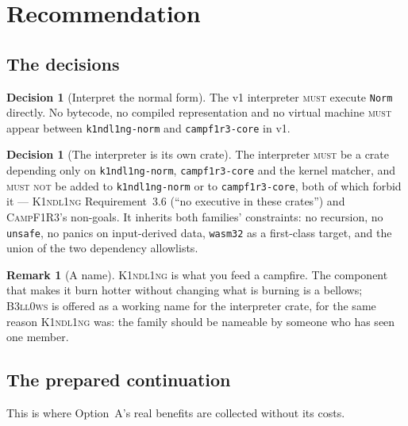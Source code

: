 \documentclass[11pt,a4paper]{article}
\newcommand{\code}[1]{\texttt{#1}}
\newcommand{\Kind}{\textsc{K1ndl1ng}}
\newcommand{\Camp}{\textsc{CampF1R3}}
\newcommand{\Bell}{\textsc{B3ll0ws}}
\newcommand{\MUST}{\textsc{must}}
\newcommand{\MUSTNOT}{\textsc{must not}}
\newcommand{\Norm}{\code{Norm}}
\theoremstyle{definition}
\newtheorem{decision}[definition]{Decision}
\newtheorem{remark}[definition]{Remark}
\theoremstyle{plain}
\begin{document}
\section{Recommendation}\label{sec:rec}

\subsection{The decisions}

\begin{decision}[Interpret the normal form]\label{dec:main}
The v1 interpreter \MUST{} execute \Norm{} directly. No bytecode, no compiled
representation and no virtual machine \MUST{} appear between
\code{k1ndl1ng-norm} and \code{campf1r3-core} in v1.
\end{decision}

\begin{decision}[The interpreter is its own crate]\label{dec:crate}
The interpreter \MUST{} be a crate depending only on \code{k1ndl1ng-norm},
\code{campf1r3-core} and the kernel matcher, and \MUSTNOT{} be added to
\code{k1ndl1ng-norm} or to \code{campf1r3-core}, both of which forbid it ---
\Kind{} Requirement~3.6 (``no executive in these crates'') and \Camp's
non-goals. It inherits both families' constraints: no recursion, no
\code{unsafe}, no panics on input-derived data, \code{wasm32} as a first-class
target, and the union of the two dependency allowlists.
\end{decision}

\begin{remark}[A name]
\Kind{} is what you feed a campfire. The component that makes it burn hotter
without changing what is burning is a bellows; \Bell{} is offered as a working
name for the interpreter crate, for the same reason \Kind{} was: the family
should be nameable by someone who has seen one member.
\end{remark}

\subsection{The prepared continuation}\label{sec:plan}

This is where Option~A's real benefits are collected without its costs.
\end{document}

